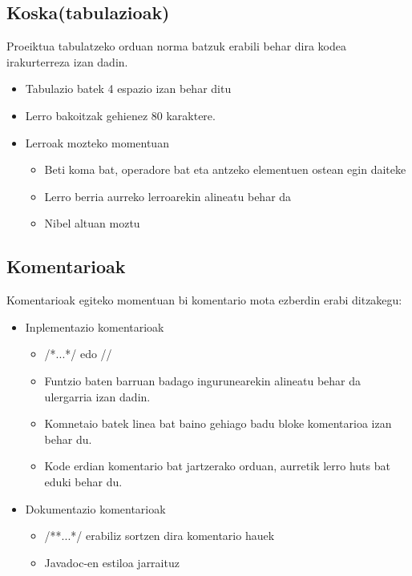 \subsection{Koska(tabulazioak)}
Proeiktua tabulatzeko orduan norma batzuk erabili behar dira kodea irakurterreza izan dadin.
   \begin{itemize}
	\item Tabulazio batek 4 espazio izan behar ditu
	\item Lerro bakoitzak gehienez 80 karaktere.
	\item Lerroak mozteko momentuan
	\begin{itemize}
	  \item Beti koma bat, operadore bat eta antzeko elementuen ostean egin daiteke
	  \item Lerro berria aurreko lerroarekin alineatu behar da
	  \item Nibel altuan moztu
	\end{itemize}
    \end{itemize}
   


\subsection{Komentarioak}
  Komentarioak egiteko momentuan bi komentario mota ezberdin erabi ditzakegu:
	\begin{itemize}
	  \item Inplementazio komentarioak
	    \begin{itemize}
	      \item /*...*/ edo //
	      \item Funtzio baten barruan badago ingurunearekin alineatu behar da ulergarria izan dadin.
	      \item Komnetaio batek linea bat baino gehiago badu bloke komentarioa izan behar du.
	      \item Kode erdian komentario bat jartzerako orduan, aurretik lerro huts bat eduki behar du.
	    \end{itemize}
	  \item Dokumentazio komentarioak
	      \begin{itemize}
	      \item /**...*/ erabiliz sortzen dira komentario hauek
	      \item Javadoc-en estiloa jarraituz
	    \end{itemize}
	\end{itemize}
 

